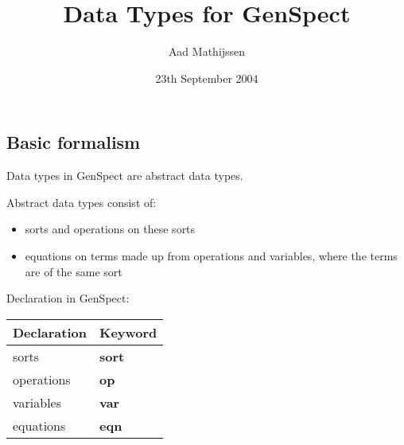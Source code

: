 \documentclass{article}
\title{\Huge Data Types for GenSpect}
\author{\Large Aad Mathijssen}
\date{\large 23th September 2004}
\newcommand{\kwsort}{{\bf sort}}
\newcommand{\kwop}{{\bf op}}
\newcommand{\kwvar}{{\bf var}}
\newcommand{\kweqn}{{\bf eqn}}
\begin{document}
\begin{slide}
\maketitle
\end{slide}

\begin{slidetop}
\section*{Basic formalism}

Data types in GenSpect are abstract data types.

\bigskip
Abstract data types consist of:
\begin{itemize}
\item sorts and operations on these sorts
\item equations on terms made up from operations and variables, where the terms are of the same sort
\end{itemize}

\bigskip
Declaration in GenSpect:
\begin{center}
\begin{tabular}{|l|l|}
\hline
Declaration            & Keyword\\\hline
sorts                  & \kwsort\\
operations             & \kwop\\
variables              & \kwvar\\
equations              & \kweqn\\\hline
\end{tabular}
\end{center}
\end{slidetop}
\end{document}

